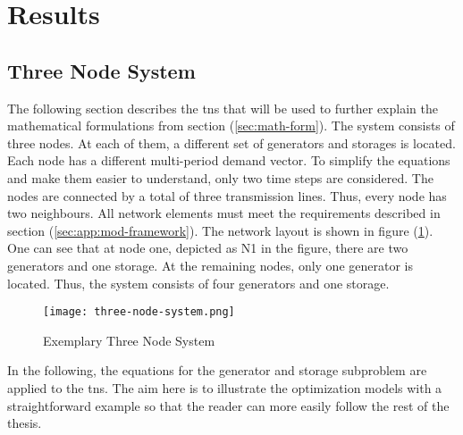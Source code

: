\section{Results}

\subsection{Three Node System}
\label{sec:res:tns}

The following section describes the \gls{tns} that will be used to further explain the mathematical formulations from section (\ref{sec:math-form}). The system consists of three nodes. At each of them, a different set of generators and storages is located. Each node has a different multi-period demand vector. To simplify the equations and make them easier to understand, only two time steps are considered. The nodes are connected by a total of three transmission lines. Thus, every node has two neighbours. All network elements must meet the requirements described in section (\ref{sec:app:mod-framework}). The network layout is shown in figure (\ref{fig:tns}). One can see that at node one, depicted as N1 in the figure, there are two generators and one storage. At the remaining nodes, only one generator is located. Thus, the system consists of four generators and one storage.

\begin{figure}[h]
	\centering
	\texttt{[image: three-node-system.png]}
	\caption{Exemplary Three Node System}
	\label{fig:tns}
\end{figure}

In the following, the equations for the generator and storage subproblem are applied to the \gls{tns}. The aim here is to illustrate the optimization models with a straightforward example so that the reader can more easily follow the rest of the thesis.